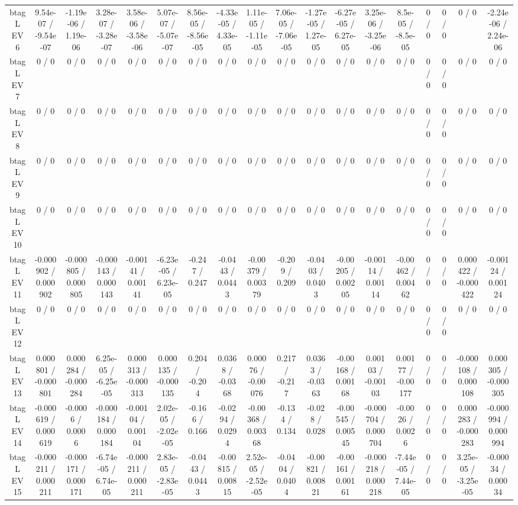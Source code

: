 \documentclass[10pt]{article}
\begin{document}
\begin{table}[htbp]
\begin{center}
\begin{tabular}{|c|c|c|c|c|c|c|c|c|c|c|c|c|c|c|c|c|c|}
  btag L EV 6 & 9.54e-07 / -9.54e-07 & -1.19e-06 / 1.19e-06 & 3.28e-07 / -3.28e-07 & 3.58e-06 / -3.58e-06 & 5.07e-07 / -5.07e-07 & 8.56e-05 / -8.56e-05 & -4.33e-05 / 4.33e-05 & 1.11e-05 / -1.11e-05 & 7.06e-05 / -7.06e-05 & -1.27e-05 / 1.27e-05 & -6.27e-05 / 6.27e-05 & 3.25e-06 / -3.25e-06 & 8.5e-05 / -8.5e-05 & 0 / 0 & 0 / 0 & 0 / 0 & -2.24e-06 / 2.24e-06 \\ 
  btag L EV 7 & 0 / 0 & 0 / 0 & 0 / 0 & 0 / 0 & 0 / 0 & 0 / 0 & 0 / 0 & 0 / 0 & 0 / 0 & 0 / 0 & 0 / 0 & 0 / 0 & 0 / 0 & 0 / 0 & 0 / 0 & 0 / 0 & 0 / 0 \\ 
  btag L EV 8 & 0 / 0 & 0 / 0 & 0 / 0 & 0 / 0 & 0 / 0 & 0 / 0 & 0 / 0 & 0 / 0 & 0 / 0 & 0 / 0 & 0 / 0 & 0 / 0 & 0 / 0 & 0 / 0 & 0 / 0 & 0 / 0 & 0 / 0 \\ 
  btag L EV 9 & 0 / 0 & 0 / 0 & 0 / 0 & 0 / 0 & 0 / 0 & 0 / 0 & 0 / 0 & 0 / 0 & 0 / 0 & 0 / 0 & 0 / 0 & 0 / 0 & 0 / 0 & 0 / 0 & 0 / 0 & 0 / 0 & 0 / 0 \\ 
  btag L EV 10 & 0 / 0 & 0 / 0 & 0 / 0 & 0 / 0 & 0 / 0 & 0 / 0 & 0 / 0 & 0 / 0 & 0 / 0 & 0 / 0 & 0 / 0 & 0 / 0 & 0 / 0 & 0 / 0 & 0 / 0 & 0 / 0 & 0 / 0 \\ 
  btag L EV 11 & -0.000902 / 0.000902 & -0.000805 / 0.000805 & -0.000143 / 0.000143 & -0.00141 / 0.00141 & -6.23e-05 / 6.23e-05 & -0.247 / 0.247 & -0.0443 / 0.0443 & -0.00379 / 0.00379 & -0.209 / 0.209 & -0.0403 / 0.0403 & -0.00205 / 0.00205 & -0.00114 / 0.00114 & -0.00462 / 0.00462 & 0 / 0 & 0 / 0 & 0.000422 / -0.000422 & -0.00124 / 0.00124 \\ 
  btag L EV 12 & 0 / 0 & 0 / 0 & 0 / 0 & 0 / 0 & 0 / 0 & 0 / 0 & 0 / 0 & 0 / 0 & 0 / 0 & 0 / 0 & 0 / 0 & 0 / 0 & 0 / 0 & 0 / 0 & 0 / 0 & 0 / 0 & 0 / 0 \\ 
  btag L EV 13 & 0.000801 / -0.000801 & 0.000284 / -0.000284 & 6.25e-05 / -6.25e-05 & 0.000313 / -0.000313 & 0.000135 / -0.000135 & 0.204 / -0.204 & 0.0368 / -0.0368 & 0.00076 / -0.00076 & 0.217 / -0.217 & 0.0363 / -0.0363 & -0.00168 / 0.00168 & 0.00103 / -0.00103 & 0.00177 / -0.00177 & 0 / 0 & 0 / 0 & -0.000108 / 0.000108 & 0.000305 / -0.000305 \\ 
  btag L EV 14 & -0.000619 / 0.000619 & -0.0006 / 0.0006 & -0.000184 / 0.000184 & -0.00104 / 0.00104 & 2.02e-05 / -2.02e-05 & -0.166 / 0.166 & -0.0294 / 0.0294 & -0.00368 / 0.00368 & -0.134 / 0.134 & -0.028 / 0.028 & -0.00545 / 0.00545 & -0.000704 / 0.000704 & -0.0026 / 0.0026 & 0 / 0 & 0 / 0 & 0.000283 / -0.000283 & -0.000994 / 0.000994 \\ 
  btag L EV 15 & -0.000211 / 0.000211 & -0.000171 / 0.000171 & -6.74e-05 / 6.74e-05 & -0.000211 / 0.000211 & 2.83e-05 / -2.83e-05 & -0.0443 / 0.0443 & -0.00815 / 0.00815 & 2.52e-05 / -2.52e-05 & -0.0404 / 0.0404 & -0.00821 / 0.00821 & -0.00161 / 0.00161 & -0.000218 / 0.000218 & -7.44e-05 / 7.44e-05 & 0 / 0 & 0 / 0 & 3.25e-05 / -3.25e-05 & -0.00034 / 0.00034 \\ 

\end{tabular}
\end{center}
\end{table}
\end{document}
